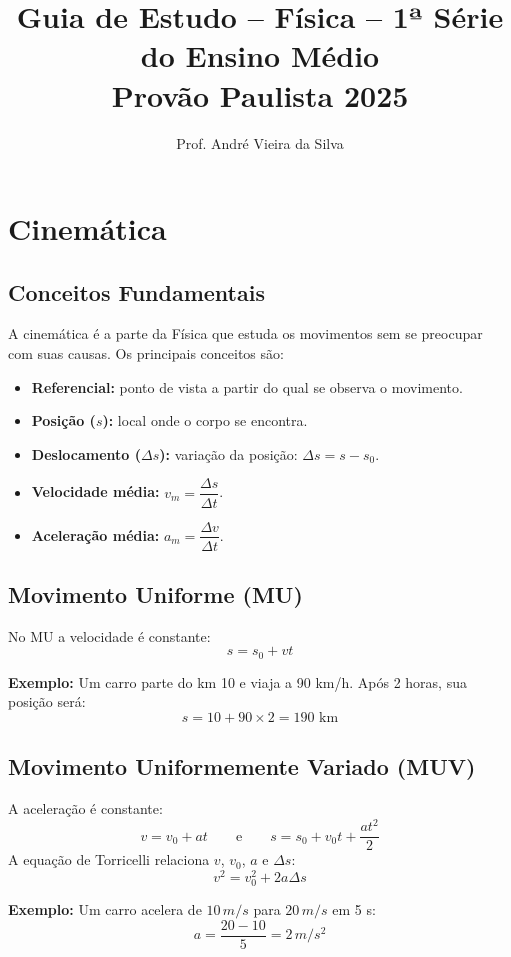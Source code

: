 \documentclass[12pt,a4paper]{article}
\title{\textbf{Guia de Estudo – Física – 1ª Série do Ensino Médio}\\Provão Paulista 2025}
\author{Prof. André Vieira da Silva}
\date{}
\begin{document}
\maketitle
\tableofcontents
\newpage

\section{Cinemática}

\subsection{Conceitos Fundamentais}
A cinemática é a parte da Física que estuda os movimentos sem se preocupar com suas causas.  
Os principais conceitos são:

\begin{itemize}
    \item \textbf{Referencial:} ponto de vista a partir do qual se observa o movimento.
    \item \textbf{Posição ($s$):} local onde o corpo se encontra.
    \item \textbf{Deslocamento ($\Delta s$):} variação da posição: $\Delta s = s - s_0$.
    \item \textbf{Velocidade média:} $v_m = \dfrac{\Delta s}{\Delta t}$.
    \item \textbf{Aceleração média:} $a_m = \dfrac{\Delta v}{\Delta t}$.
\end{itemize}

\subsection{Movimento Uniforme (MU)}
No MU a velocidade é constante:
\[
s = s_0 + vt
\]

\textbf{Exemplo:} Um carro parte do km 10 e viaja a 90 km/h.  
Após 2 horas, sua posição será:
\[
s = 10 + 90 \times 2 = 190 \text{ km}
\]

\subsection{Movimento Uniformemente Variado (MUV)}
A aceleração é constante:
\[
v = v_0 + at \qquad \text{e} \qquad s = s_0 + v_0t + \frac{at^2}{2}
\]
A equação de Torricelli relaciona $v$, $v_0$, $a$ e $\Delta s$:
\[
v^2 = v_0^2 + 2a\Delta s
\]

\textbf{Exemplo:} Um carro acelera de $10\,m/s$ para $20\,m/s$ em 5 s:
\[
a = \frac{20 - 10}{5} = 2\,m/s^2
\]
\end{document}
